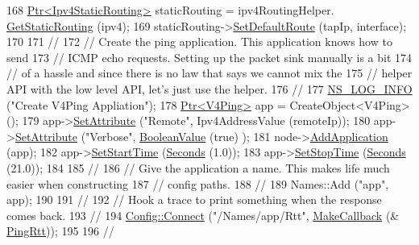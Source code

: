 \begin{DoxyCode}
168   \hyperlink{classns3_1_1Ptr}{Ptr<Ipv4StaticRouting>} staticRouting = ipv4RoutingHelper.
      \hyperlink{classns3_1_1Ipv4StaticRoutingHelper_a731206e50d305695dac7fb2ef963a4bb}{GetStaticRouting} (ipv4);
169   staticRouting->\hyperlink{classns3_1_1Ipv4StaticRouting_aee30fa3246c2b42f122dabdff2725331}{SetDefaultRoute} (tapIp, interface);
170 
171   \textcolor{comment}{//}
172   \textcolor{comment}{// Create the ping application.  This application knows how to send}
173   \textcolor{comment}{// ICMP echo requests.  Setting up the packet sink manually is a bit}
174   \textcolor{comment}{// of a hassle and since there is no law that says we cannot mix the}
175   \textcolor{comment}{// helper API with the low level API, let's just use the helper.}
176   \textcolor{comment}{//}
177   \hyperlink{group__logging_gafbd73ee2cf9f26b319f49086d8e860fb}{NS\_LOG\_INFO} (\textcolor{stringliteral}{"Create V4Ping Appliation"});
178   \hyperlink{classns3_1_1Ptr}{Ptr<V4Ping>} app = CreateObject<V4Ping> ();
179   app->\hyperlink{classns3_1_1ObjectBase_ac60245d3ea4123bbc9b1d391f1f6592f}{SetAttribute} (\textcolor{stringliteral}{"Remote"}, Ipv4AddressValue (remoteIp));
180   app->\hyperlink{classns3_1_1ObjectBase_ac60245d3ea4123bbc9b1d391f1f6592f}{SetAttribute} (\textcolor{stringliteral}{"Verbose"}, \hyperlink{classns3_1_1BooleanValue}{BooleanValue} (\textcolor{keyword}{true}) );
181   node->\hyperlink{classns3_1_1Node_ab98b4fdc4aadc86366b80e8a79a53f47}{AddApplication} (app);
182   app->\hyperlink{classns3_1_1Application_a8360a49748e30c52ffdcc7a305c3cd48}{SetStartTime} (\hyperlink{group__timecivil_ga33c34b816f8ff6628e33d5c8e9713b9e}{Seconds} (1.0));
183   app->\hyperlink{classns3_1_1Application_a732c1fdadf0be176c753a2ce6e27dff9}{SetStopTime} (\hyperlink{group__timecivil_ga33c34b816f8ff6628e33d5c8e9713b9e}{Seconds} (21.0));
184 
185   \textcolor{comment}{//}
186   \textcolor{comment}{// Give the application a name.  This makes life much easier when constructing}
187   \textcolor{comment}{// config paths.}
188   \textcolor{comment}{//}
189   Names::Add (\textcolor{stringliteral}{"app"}, app);
190 
191   \textcolor{comment}{//}
192   \textcolor{comment}{// Hook a trace to print something when the response comes back.}
193   \textcolor{comment}{//}
194   \hyperlink{group__config_ga4014f151241cd0939b6cb64409605736}{Config::Connect} (\textcolor{stringliteral}{"/Names/app/Rtt"}, \hyperlink{group__makecallbackmemptr_ga9376283685aa99d204048d6a4b7610a4}{MakeCallback} (&
      \hyperlink{fd-planetlab-ping_8cc_a1a49f760c7e3da367b3406515d2a3ef9}{PingRtt}));
195 
196   \textcolor{comment}{//}

\end{DoxyCode}
